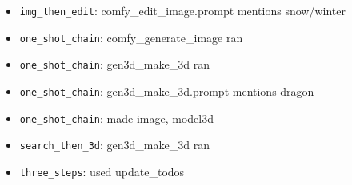 \begin{itemize}[leftmargin=*,itemsep=2pt]
\item \texttt{img\_then\_edit}: comfy\_edit\_image.prompt mentions snow/winter 
\item \texttt{one\_shot\_chain}: comfy\_generate\_image ran 
\item \texttt{one\_shot\_chain}: gen3d\_make\_3d ran 
\item \texttt{one\_shot\_chain}: gen3d\_make\_3d.prompt mentions dragon 
\item \texttt{one\_shot\_chain}: made image, model3d 
\item \texttt{search\_then\_3d}: gen3d\_make\_3d ran 
\item \texttt{three\_steps}: used update\_todos 
\end{itemize}
